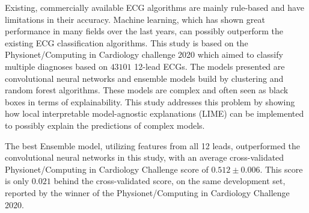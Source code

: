 
Existing, commercially available ECG algorithms are mainly rule-based and have limitations in their accuracy. Machine learning, which has shown great performance in many fields over the last years, can possibly outperform the existing ECG classification algorithms. This study is based on the Physionet/Computing in Cardiology challenge 2020 which aimed to classify multiple diagnoses based on $43101$ 12-lead ECGs. The models presented are convolutional neural networks and ensemble models build by clustering and random forest algorithms. These models are complex and often seen as black boxes in terms of explainability. This study addresses this problem by showing how local interpretable model-agnostic explanations (LIME) can be implemented to possibly explain the predictions of complex models.

The best Ensemble model, utilizing features from all 12 leads, outperformed the convolutional neural networks in this study, with an average cross-validated Physionet/Computing in Cardiology Challenge score of $0.512\pm 0.006$. This score is only $0.021$ behind the cross-validated score, on the same development set, reported by the winner of the Physionet/Computing in Cardiology Challenge 2020.

